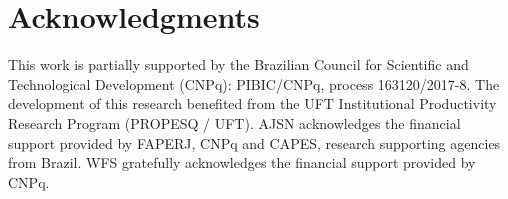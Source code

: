 \section*{Acknowledgments}\label{sec:Acknowledgment}

This work is partially supported by the Brazilian Council for Scientific and Technological Development (CNPq): PIBIC/CNPq, process 163120/2017-8. The development of this research benefited from the UFT Institutional Productivity Research Program (PROPESQ / UFT). AJSN acknowledges the financial support provided by FAPERJ, CNPq and CAPES, research supporting agencies from Brazil. WFS gratefully acknowledges the financial support provided by CNPq.

	